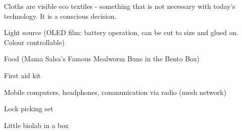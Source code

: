 \newpage
\begin{npcBox}[title=Primrose continued]
    \begin{npcDescription}
    Cloths are visible eco textiles - something that is not necessary with today's technology. It is a conscious decision.
    \end{npcDescription}


    \begin{equipment}
    \item Light source (OLED film: battery operation, can be cut to size and glued on. Colour controllable)
    \item Food (Mama Salsa's Famous Mealworm Buns in the Bento Box)
    \item First aid kit
    \item Mobile computers, headphones, communication via radio (mesh network)
    \item Lock picking set
    \item Little biolab in a box
    \end{equipment}
\end{npcBox}



